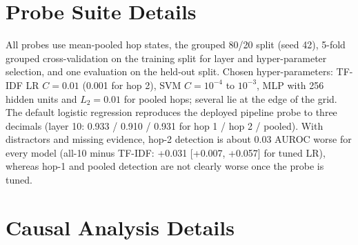 \documentclass[11pt]{article}
\begin{document}
\section{Probe Suite Details}
\label{app:paired}

All probes use mean-pooled hop states, the grouped 80/20 split (seed 42), 5-fold grouped cross-validation on the training split for layer and hyper-parameter selection, and one evaluation on the held-out split. Chosen hyper-parameters: TF-IDF LR $C{=}0.01$ (0.001 for hop 2), SVM $C{=}10^{-4}$ to $10^{-3}$, MLP with 256 hidden units and $L_2{=}0.01$ for pooled hops; several lie at the edge of the grid. The default logistic regression reproduces the deployed pipeline probe to three decimals (layer 10: 0.933 / 0.910 / 0.931 for hop 1 / hop 2 / pooled). With distractors and missing evidence, hop-2 detection is about 0.03 AUROC worse for every model (all-10 minus TF-IDF: +0.031 [+0.007, +0.057] for tuned LR), whereas hop-1 and pooled detection are not clearly worse once the probe is tuned.

\begin{table}[t]
\centering\small
{}
\caption{Paired bootstrap differences in test AUROC at the cross-validation-selected layers (same test rows, 2,000 resamples of question groups, 95\% intervals).}
\label{tab:paired}
\end{table}

\section{Causal Analysis Details}
\label{app:causal}
\end{document}
